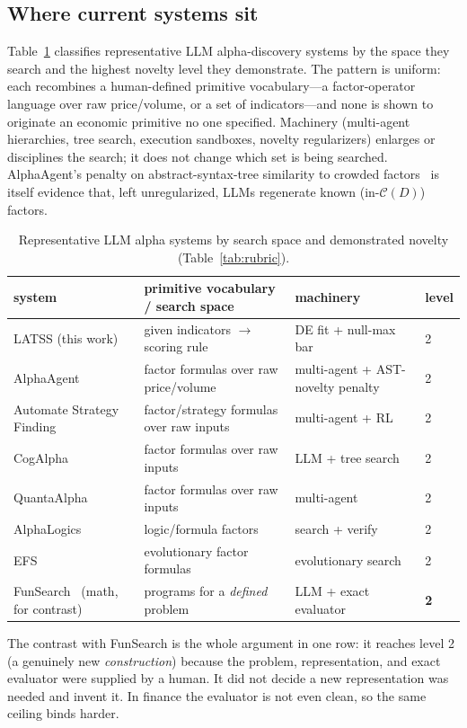 \subsection{Where current systems sit}
\label{sec:audit}

Table~\ref{tab:audit} classifies representative LLM alpha-discovery systems by the space they search
and the highest novelty level they demonstrate. The pattern is uniform: each recombines a
human-defined primitive vocabulary---a factor-operator language over raw price/volume, or a set of
indicators---and none is shown to originate an economic primitive no one specified. Machinery
(multi-agent hierarchies, tree search, execution sandboxes, novelty regularizers) enlarges or
disciplines the search; it does not change which set is being searched. AlphaAgent's penalty on
abstract-syntax-tree similarity to crowded factors~\cite{alphaagent} is itself evidence that, left
unregularized, LLMs regenerate known (in-$\mathcal{C}(D)$) factors.

\begin{table}[htbp]
\centering
\caption{Representative LLM alpha systems by search space and demonstrated novelty (Table~\ref{tab:rubric}).}
\label{tab:audit}
\small
\begin{tabular}{@{}p{3.4cm} p{5.2cm} p{2.2cm} p{1.6cm}@{}}
\toprule
system & primitive vocabulary / search space & machinery & level \\
\midrule
LATSS (this work) & given indicators $\to$ scoring rule & DE fit + null-max bar & 2 \\
AlphaAgent~\cite{alphaagent} & factor formulas over raw price/volume & multi-agent + AST-novelty penalty & 2 \\
Automate Strategy Finding~\cite{automate} & factor/strategy formulas over raw inputs & multi-agent + RL & 2 \\
CogAlpha~\cite{cogalpha} & factor formulas over raw inputs & LLM + tree search & 2 \\
QuantaAlpha~\cite{quantaalpha} & factor formulas over raw inputs & multi-agent & 2 \\
AlphaLogics~\cite{alphalogics} & logic/formula factors & search + verify & 2 \\
EFS~\cite{efs} & evolutionary factor formulas & evolutionary search & 2 \\
FunSearch~\cite{funsearch} (math, for contrast) & programs for a \emph{defined} problem & LLM + exact evaluator & \textbf{2} \\
\bottomrule
\end{tabular}
\end{table}

The contrast with FunSearch is the whole argument in one row: it reaches level 2 (a genuinely new
\emph{construction}) because the problem, representation, and exact evaluator were supplied by a
human. It did not decide a new representation was needed and invent it. In finance the evaluator is
not even clean, so the same ceiling binds harder.
